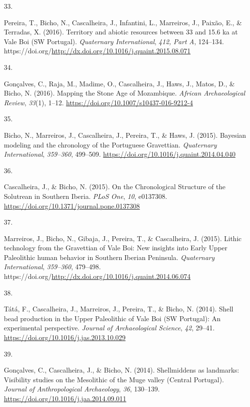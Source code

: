 \documentclass[11pt,a4paper,]{awesome-cv}
\newlength{\cslhangindent}
\newlength{\csllabelwidth}
\newenvironment{CSLReferences}[2] %
 {\begin{list}{}{%
  \setlength{\itemindent}{0pt}
  \setlength{\leftmargin}{0pt}
  \setlength{\parsep}{0pt}
  \ifodd #1
   \setlength{\leftmargin}{\cslhangindent}
   \setlength{\itemindent}{-1\cslhangindent}
  \fi
  \setlength{\itemsep}{#2\baselineskip}}}
 {\end{list}}
\newcommand{\CSLLeftMargin}[1]{\parbox[t]{\csllabelwidth}{\strut#1\strut}}
\newcommand{\CSLRightInline}[1]{\parbox[t]{\linewidth - \csllabelwidth}{\strut#1\strut}}
\begin{document}
\begin{CSLReferences}{0}{0}
\CSLLeftMargin{33. }%
\CSLRightInline{Pereira, T., Bicho, N., Cascalheira, J., Infantini, L.,
Marreiros, J., Paixão, E., \& Terradas, X. (2016). Territory and abiotic
resources between 33 and 15.6 ka at Vale Boi (SW Portugal).
\emph{Quaternary International}, \emph{412, Part A}, 124--134.
https://doi.org/\url{http://dx.doi.org/10.1016/j.quaint.2015.08.071}}

\CSLLeftMargin{34. }%
\CSLRightInline{Gonçalves, C., Raja, M., Madime, O., Cascalheira, J.,
Haws, J., Matos, D., \& Bicho, N. (2016). Mapping the Stone Age of
Mozambique. \emph{African Archaeological Review}, \emph{33}(1), 1--12.
\url{https://doi.org/10.1007/s10437-016-9212-4}}

\CSLLeftMargin{35. }%
\CSLRightInline{Bicho, N., Marreiros, J., Cascalheira, J., Pereira, T.,
\& Haws, J. (2015). Bayesian modeling and the chronology of the
Portuguese Gravettian. \emph{Quaternary International}, \emph{359--360},
499--509. \url{https://doi.org/10.1016/j.quaint.2014.04.040}}

\CSLLeftMargin{36. }%
\CSLRightInline{Cascalheira, J., \& Bicho, N. (2015). On the
Chronological Structure of the Solutrean in Southern Iberia. \emph{PLoS
One}, \emph{10}, e0137308.
\url{https://doi.org/10.1371/journal.pone.0137308}}

\CSLLeftMargin{37. }%
\CSLRightInline{Marreiros, J., Bicho, N., Gibaja, J., Pereira, T., \&
Cascalheira, J. (2015). Lithic technology from the Gravettian of Vale
Boi: New insights into Early Upper Paleolithic human behavior in
Southern Iberian Peninsula. \emph{Quaternary International},
\emph{359--360}, 479--498.
https://doi.org/\url{http://dx.doi.org/10.1016/j.quaint.2014.06.074}}

\CSLLeftMargin{38. }%
\CSLRightInline{Tátá, F., Cascalheira, J., Marreiros, J., Pereira, T.,
\& Bicho, N. (2014). Shell bead production in the Upper Paleolithic of
Vale Boi (SW Portugal): An experimental perspective. \emph{Journal of
Archaeological Science}, \emph{42}, 29--41.
\url{https://doi.org/10.1016/j.jas.2013.10.029}}

\CSLLeftMargin{39. }%
\CSLRightInline{Gonçalves, C., Cascalheira, J., \& Bicho, N. (2014).
Shellmiddens as landmarks: Visibility studies on the Mesolithic of the
Muge valley (Central Portugal). \emph{Journal of Anthropological
Archaeology}, \emph{36}, 130--139.
\url{https://doi.org/10.1016/j.jaa.2014.09.011}}


\end{CSLReferences}
\end{document}
